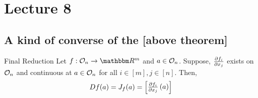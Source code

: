 \documentclass[Analysis-3]{subfiles}
\begin{document}
\chapter*{Lecture 8} %
\setcounter{chapter}{8} %
\setcounter{section}{0}

\section{A kind of converse of the [above theorem]}

\begin{Thm}{Final Reduction}{}\label{thm:finalred}
  Let $ f :\Op{n} \to \R^m $ and $ a \in \mathcal{O}_{n} $. Suppose, $ \pdv{f_i}{x_j} $ exists on $ \mathcal{O}_{n} $ and continuous at $ a \in \mathcal{O}_{n} $ for all $ i\in [m], j\in [n] $. Then,
  \begin{align*}
    Df(a) = J_{f}(a) = \begin{bmatrix}
                         \pdv{f_i}{x_j}\left( a \right)
                       \end{bmatrix}
  \end{align*}
\end{Thm}
\end{document}
